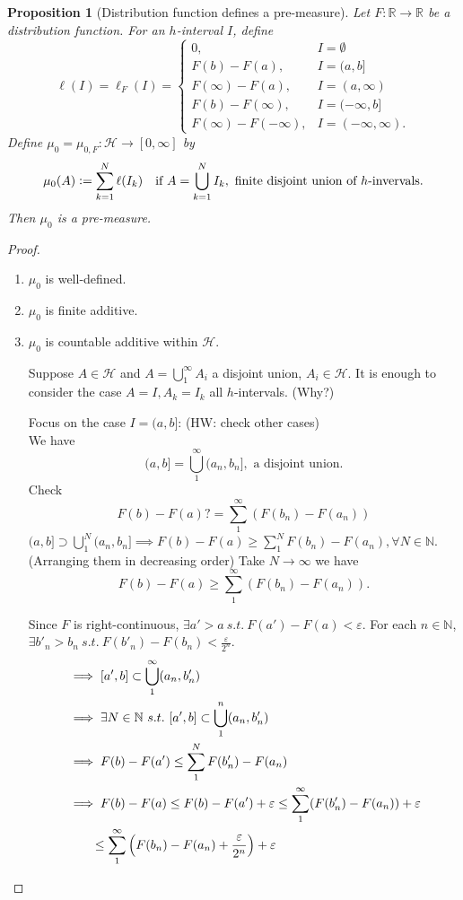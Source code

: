 \documentclass{report}
\newcommand{\R}{\mathbb{R}}
\newcommand{\N}{\mathbb{N}}
\newcommand{\st}{\ s.t.\ }
\newcommand{\defeq}{\vcentcolon=}
\newtheorem{proposition}[theorem]{Proposition}
\theoremstyle{definition}
\theoremstyle{remark}
\begin{document}
\begin{proposition}[Distribution function defines a pre-measure]
Let $F: \R \to \R$ be a distribution function. For an $h$-interval $I$, define
\[
\ell(I) = \ell_F(I) = \begin{cases}
0,  & I = \emptyset \\
F(b) - F(a), & I = (a, b] \\
F(\infty) - F(a), & I = (a, \infty) \\
F(b) - F(\infty), & I = (-\infty, b] \\
F(\infty) - F(-\infty), & I = (-\infty, \infty). 
\end{cases}
\]
Define $\mu_0 = \mu_{0, F}: \mathcal{H} \to [0, \infty]$ by
\[
\mu_0(A) \defeq \sum_{k=1}^N \ell(I_k) \quad \text{if } A = \bigcup_{k=1}^N I_k, \text{ finite disjoint union of $h$-invervals.}
\]
Then $\mu_0$ is a pre-measure.
\end{proposition}
\begin{proof}
\begin{enumerate}
\item $\mu_0$ is well-defined.
\item $\mu_0$ is finite additive.
\item $\mu_0$ is countable additive within $\mathcal{H}$.

Suppose $A \in \mathcal{H}$ and $A = \bigcup_1^\infty A_i$ a disjoint union, $A_i \in \mathcal{H}$. It is enough to consider the case $A = I, A_k = I_k$ all $h$-intervals. (Why?)

Focus on the case $I = (a, b]$: (HW: check other cases)\\
We have
\[(a, b] = \bigcup_1^\infty(a_n, b_n], \text{ a disjoint union}.\]
Check
\[F(b) - F(a) ?= \sum_1^\infty(F(b_n) - F(a_n))\]
$(a, b] \supset \bigcup_1^N (a_n, b_n] \implies F(b) - F(a) \geq \sum_1^N F(b_n) - F(a_n), \forall N \in \N$. (Arranging them in decreasing order) Take $N \to \infty$ we have
\[F(b) - F(a) \geq \sum_1^\infty(F(b_n) - F(a_n)).\]

Since $F$ is right-continuous, $\exists a' > a \st F(a') - F(a) < \varepsilon$.
For each $n \in \N$, $\exists b'_n > b_n \st F(b'_n) - F(b_n) < \frac{\varepsilon}{2^n}$. 
\begin{align*}
& \implies [a', b] \subset \bigcup_1^\infty(a_n, b'_n) \\
& \implies \exists N \in \N \st [a', b] \subset \bigcup_1^n (a_n, b'_n)\\
& \implies F(b) - F(a') \leq \sum_1^N F(b'_n) - F(a_n) \\
& \implies F(b) - F(a) \leq F(b) - F(a') + \varepsilon \leq \sum_1^\infty(F(b'_n)-F(a_n)) + \varepsilon \\
& \quad \quad \leq \sum_1^\infty\left(F(b_n)-F(a_n) + \frac{\varepsilon}{2^n}\right) + \varepsilon \qedhere
\end{align*}
\end{enumerate}
\end{proof}
\end{document}
